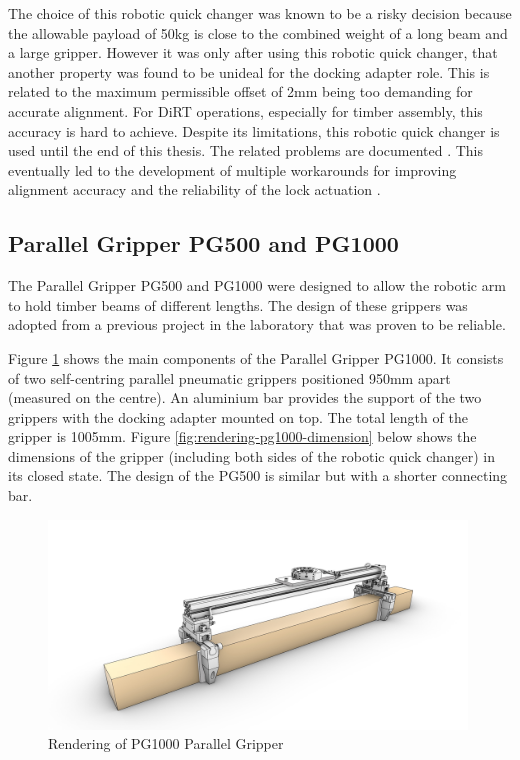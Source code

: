 The choice of this robotic quick changer was known to be a risky decision because the allowable payload of 50kg is close to the combined weight of a long beam and a large gripper. However it was only after using this robotic quick changer, that another property was found to be unideal for the docking adapter role. This is related to the maximum permissible offset of 2mm being too demanding for accurate alignment. For DiRT operations, especially for timber assembly, this accuracy is hard to achieve. Despite its limitations, this robotic quick changer is used until the end of this thesis. The related problems are documented . This eventually led to the development of multiple workarounds for improving alignment accuracy  and the reliability of the lock actuation .

\subsection{Parallel Gripper PG500 and PG1000}
\label{subsection:exploration-2-parallel-gripper-pg500-and-pg1000}

The Parallel Gripper PG500 and PG1000 were designed to allow the robotic arm to hold timber beams of different lengths. The design of these grippers was adopted from a previous project in the laboratory that was proven to be reliable. 

Figure \ref{fig:rendering-pg1000} shows the main components of the Parallel Gripper PG1000. It consists of two self-centring parallel pneumatic grippers positioned 950mm apart (measured on the centre). An aluminium bar provides the support of the two grippers with the docking adapter mounted on top. The total length of the gripper is 1005mm. Figure \ref{fig:rendering-pg1000-dimension} below shows the dimensions of the gripper (including both sides of the robotic quick changer) in its closed state. The design of the PG500 is similar but with a shorter connecting bar. 

\begin{figure}
    \centering
    \includegraphics[width=0.99\textwidth]{images/05/image7.jpg}
    \caption{Rendering of PG1000 Parallel Gripper}
    \label{fig:rendering-pg1000}
\end{figure}


